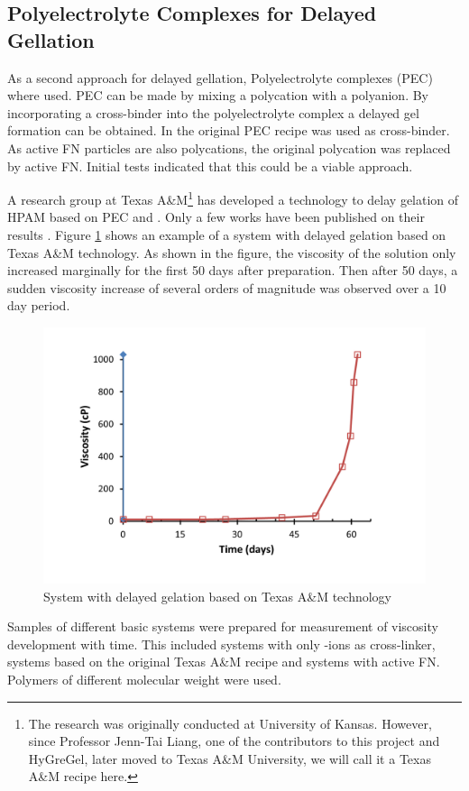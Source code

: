 \documentclass[journal = enfuem, manuscript =  article]{achemso}
\begin{document}
\subsection{Polyelectrolyte Complexes for Delayed Gellation}
As a second approach for delayed gellation, Polyelectrolyte complexes (PEC) where used. PEC can be made by mixing a polycation with a polyanion. By incorporating a cross-binder into the polyelectrolyte complex a delayed gel formation can be obtained. In the original PEC recipe  was used as cross-binder. As active FN particles are also polycations, the original polycation was replaced by active FN. Initial tests indicated that this could be a viable approach.

A research group at Texas A\&M\footnote{The research was originally conducted at University of Kansas. However, since Professor Jenn-Tai Liang, one of the contributors to this project and HyGreGel, later moved to Texas A\&M University, we will call it a Texas A\&M recipe here.} has developed a technology to delay gelation of HPAM based on PEC and . Only a few works have been published on their results \citep{Cordova2008,Johnson2010}. Figure \ref{cht:jennTai} shows an example of a system with delayed gelation based on Texas A\&M technology. As shown in the figure, the viscosity of the solution only increased marginally for the first 50 days after preparation. Then after 50 days, a sudden viscosity increase of several orders of magnitude was observed over a 10 day period.

\begin{figure}
    \centering
    \includegraphics[width=.75\textwidth]{fig/jennTai.png}
    \caption{System with delayed gelation based on Texas A\&M technology \citep{Cordova2008}}
    \label{cht:jennTai}
\end{figure}
    
Samples of different basic systems were prepared for measurement of viscosity development with time. This included systems with only -ions as cross-linker, systems based on the original Texas A\&M recipe \citep{Cordova2008} and systems with active FN. Polymers of different molecular weight were used.
    
\end{document}
